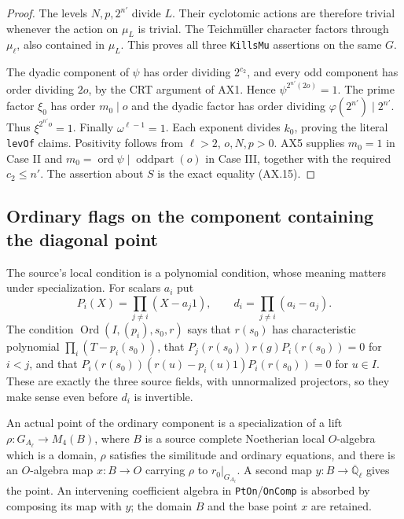 \begin{proof}
The levels $N,p,2^{n'}$ divide $L$.  Their cyclotomic actions
are therefore trivial whenever the action on $\mu_L$ is trivial.
The Teichm\"uller character factors through $\mu_\ell$, also
contained in $\mu_L$.  This proves all three \texttt{KillsMu}
assertions on the same $G$.

The dyadic component of $\psi$ has order dividing $2^{c_2}$,
and every odd component has order dividing $2o$, by the CRT
argument of AX1.  Hence $\psi^{2^{n'}(2o)}=1$.
The prime factor $\xi_0$ has order $m_0\mid o$ and the dyadic
factor has order dividing $\varphi(2^{n'})\mid2^{n'}$.
Thus $\xi^{2^{n'}o}=1$.  Finally $\omega^{\ell-1}=1$.
Each exponent divides $k_0$, proving the literal \texttt{levOf}
claims.  Positivity follows from $\ell>2$, $o,N,p>0$.
AX5 supplies $m_0=1$ in Case II and
$m_0=\operatorname{ord}\psi\mid\operatorname{oddpart}(o)$ in
Case III, together with the required $c_2\le n'$.
The assertion about $S$ is the exact equality (AX.15).
\end{proof}

\subsection{Ordinary flags on the component containing the diagonal point}

The source's local condition is a polynomial condition, whose
meaning matters under specialization.  For scalars $a_i$ put
\[
 P_i(X)=\prod_{j\ne i}(X-a_j1),\qquad
                  d_i=\prod_{j\ne i}(a_i-a_j).
 \tag{AX.25}
\]
The condition $\operatorname{Ord}(I,(p_i),s_0,r)$ says that
$r(s_0)$ has characteristic polynomial $\prod_i(T-p_i(s_0))$,
that $P_j(r(s_0))r(g)P_i(r(s_0))=0$ for $i<j$, and that
$P_i(r(s_0))(r(u)-p_i(u)1)P_i(r(s_0))=0$ for $u\in I$.
These are exactly the three source fields, with unnormalized
projectors, so they make sense even before $d_i$ is invertible.

An actual point of the ordinary component is a specialization
of a lift $\rho:G_{A_\ell}\to M_4(B)$, where $B$ is a source
complete Noetherian local $O$-algebra which is a domain,
$\rho$ satisfies the similitude and ordinary equations, and there
is an $O$-algebra map $x:B\to O$ carrying $\rho$ to
$r_0|_{G_{A_\ell}}$.  A second map
$y:B\to\overline{\mathbb Q}_\ell$ gives the point.
An intervening coefficient algebra in \texttt{PtOn}/\texttt{OnComp}
is absorbed by composing its map with $y$; the domain $B$ and
the base point $x$ are retained.

